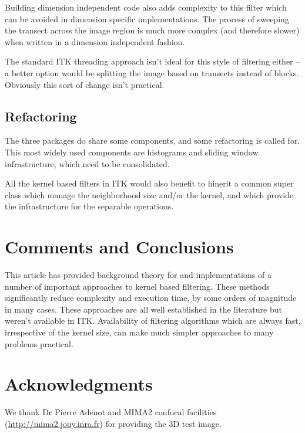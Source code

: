 \documentclass{InsightArticle}
\begin{document}
Building dimension independent code also adds complexity to this filter which can be avoided in
dimension specific implementations. The process of sweeping the transect across the image region
is much more complex (and therefore slower) when written in a dimension independent fashion.

The standard ITK threading approach isn't ideal for this style of filtering either -- a better 
option would be splitting the image based on transects instead of blocks. Obviously this
sort of change isn't practical.

\subsection{Refactoring}
The three packages do share some components, and some refactoring is
called for. This most widely used components are histograms and
sliding window infrastructure, which need to be consolidated.

All the kernel based filters in ITK would also benefit to hinerit a common
super class which manage the neighborhood size and/or the kernel, and which
provide the infrastructure for the separable operations.

\section{Comments and Conclusions}
This article has provided background theory for and implementations of
a number of important approaches to kernel based filtering. These
methods significantly reduce complexity and execution time, by some
orders of magnitude in many cases. These approaches are all well
established in the literature but weren't available in
ITK. Availability of filtering algorithms which are always fast,
irrespective of the kernel size, can make much simpler approaches to
many problems practical.

\section{Acknowledgments}
We thank Dr Pierre Adenot and MIMA2 confocal facilities
(\url{http://mima2.jouy.inra.fr}) for providing the 3D test image.

\appendix





\nocite{ITKSoftwareGuide}
\end{document}
